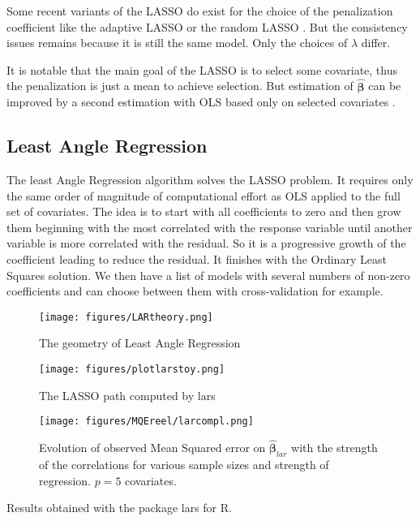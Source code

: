 \documentclass[12pt,a4paper]{report}
\begin{document}

			 Some recent variants of the \textsc{LASSO} do exist for the choice of the penalization coefficient like the adaptive \textsc{LASSO} \cite{zou2006adaptive} or the random \textsc{LASSO} \cite{wang2011random}.  But the consistency issues remains because it is still the same model. Only the choices of $\lambda$ differ.
			 
			 It is notable that the main goal of the LASSO is to select some covariate, thus the penalization is just a mean to achieve selection. But estimation of $\hat{\boldsymbol{\beta}}$ can be improved by a second estimation with OLS based only on selected covariates \cite{SAM10088}.
		\subsection{Least Angle Regression}
		The least Angle Regression algorithm solves the LASSO problem.
		It requires only the same order of magnitude of computational effort as \textsc{OLS} applied to the full set of covariates.
		The idea is to start with all coefficients to zero and then grow them beginning with the most correlated with the response variable until another variable is more correlated with the residual. So it is a progressive growth of the coefficient leading to reduce the residual. It finishes with the Ordinary Least Squares solution. We then have a list of models with several numbers of non-zero coefficients and can choose between them with cross-validation for example.
\begin{figure}[h!]
	\centering
		  \texttt{[image: figures/LARtheory.png]}
		\caption{The geometry of Least Angle Regression}
	\end{figure}
				
\begin{figure}[h!]
	\centering
		  \texttt{[image: figures/plotlarstoy.png]}
		\caption{The LASSO path computed by lars}
	\end{figure}			
	
		 \begin{figure}
	 \centering
	  \texttt{[image: figures/MQEreel/larcompl.png]}
	  \caption{Evolution of observed Mean Squared error on $\hat{\boldsymbol{\beta}}_{lar}$ with the strength of the correlations for various sample sizes and strength of regression. $p=5$ covariates. } \label{MQElarcompl}
	\end{figure}
	Results obtained with the package lars for R.
	 
\end{document}
